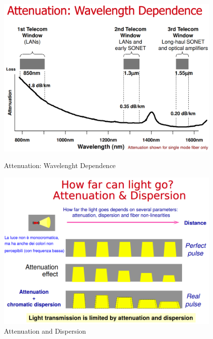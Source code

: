 \documentclass[8pt]{extarticle}
\begin{document}
\begin{figure}[H]
    \centering
    \begin{minipage}[c]{\linewidth}
        \begin{minipage}[l]{0.48\linewidth}
            \includegraphics[width=\linewidth]{images/FO5.png}
		    \caption{Attenuation: Wavelenght Dependence}\label{fig:1}
        \end{minipage}
        \hspace{0.04\linewidth}
        \begin{minipage}[l]{0.48\linewidth}
            \includegraphics[width=\linewidth]{images/FO6.png}
           	\caption{Attenuation and Dispersion}\label{fig:1}
        \end{minipage}
    \end{minipage}
\end{figure}
\end{document}
